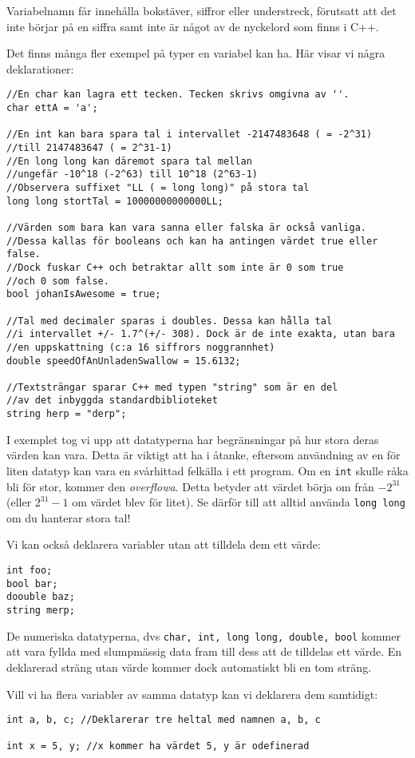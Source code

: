 Variabelnamn får innehålla bokstäver, siffror eller understreck, förutsatt att det inte börjar på en siffra samt inte är något av de nyckelord som finns i C++.

Det finns många fler exempel på typer en variabel kan ha. Här visar vi några deklarationer:

\begin{lstlisting}
//En char kan lagra ett tecken. Tecken skrivs omgivna av ''.
char ettA = 'a';

//En int kan bara spara tal i intervallet -2147483648 ( = -2^31)
//till 2147483647 ( = 2^31-1)
//En long long kan däremot spara tal mellan 
//ungefär -10^18 (-2^63) till 10^18 (2^63-1)
//Observera suffixet "LL ( = long long)" på stora tal
long long stortTal = 10000000000000LL;

//Värden som bara kan vara sanna eller falska är också vanliga.
//Dessa kallas för booleans och kan ha antingen värdet true eller false.
//Dock fuskar C++ och betraktar allt som inte är 0 som true
//och 0 som false.
bool johanIsAwesome = true;

//Tal med decimaler sparas i doubles. Dessa kan hålla tal
//i intervallet +/- 1.7^(+/- 308). Dock är de inte exakta, utan bara
//en uppskattning (c:a 16 siffrors noggrannhet)
double speedOfAnUnladenSwallow = 15.6132;

//Textsträngar sparar C++ med typen "string" som är en del
//av det inbyggda standardbiblioteket
string herp = "derp";
\end{lstlisting}


I exemplet tog vi upp att datatyperna har begränsningar på hur stora deras värden kan vara. Detta är viktigt att ha i åtanke, eftersom användning av en för liten datatyp kan vara en svårhittad felkälla i ett program. Om en \texttt{int} skulle råka bli för stor, kommer den \emph{overflowa}. Detta betyder att värdet börja om från $-2^{31}$ (eller $2^{31}-1$ om värdet blev för litet). Se därför till att alltid använda \texttt{long long} om du hanterar stora tal!

Vi kan också deklarera variabler utan att tilldela dem ett värde: 

\begin{lstlisting}
int foo;
bool bar;
doouble baz;
string merp;
\end{lstlisting}

De numeriska datatyperna, dvs \texttt{char, int, long long, double, bool} kommer att vara fyllda med slumpmässig data fram till dess att de tilldelas ett värde. En deklarerad sträng utan värde kommer dock automatiskt bli en tom sträng.

Vill vi ha flera variabler av samma datatyp kan vi deklarera dem samtidigt:

\begin{lstlisting}
int a, b, c; //Deklarerar tre heltal med namnen a, b, c

int x = 5, y; //x kommer ha värdet 5, y är odefinerad
\end{lstlisting}
